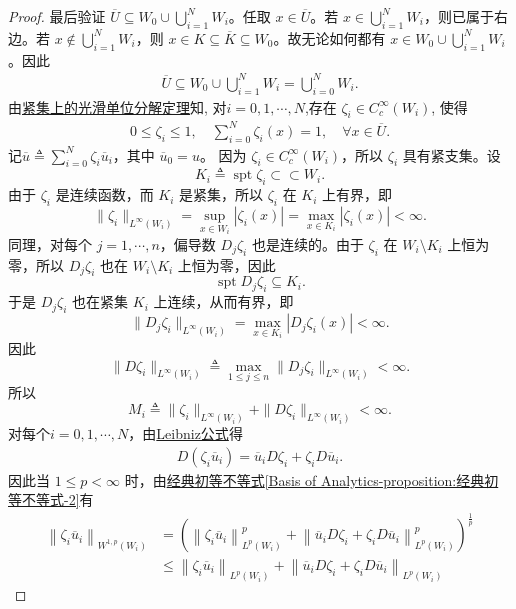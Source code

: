\documentclass[../../main.tex]{subfiles}
\begin{document}
\begin{proof}
最后验证 \(\overline{U}\subseteq W_0\cup\bigcup_{i=1}^N W_i\)。任取 \(x\in \overline{U}\)。若 \(x\in\bigcup_{i=1}^N W_i\)，则已属于右边。若 \(x\notin\bigcup_{i=1}^N W_i\)，则 \(x\in K\subseteq\overline{K}\subseteq W_0\)。故无论如何都有 \(x\in W_0\cup\bigcup_{i=1}^N W_i\)。因此
\begin{align*}
\overline{U}\subseteq W_0\cup\bigcup_{i=1}^N W_i=\bigcup_{i=0}^N W_i.
\end{align*}
由\hyperref[corollary:紧集上的光滑单位分解定理]{紧集上的光滑单位分解定理}知,
对$i=0,1,\cdots,N$,存在 $\zeta_i\in C_c^\infty(W_i)$, 使得
\begin{align*}
0\leqslant\zeta_i\leqslant1,\quad
\sum\limits_{i=0}^{N}\zeta_i(x)=1,\quad\forall x\in \overline{U}.
\end{align*}
记$\overline{u}\triangleq\sum_{i=0}^{N}\zeta_{i}\overline{u}_{i}$，其中 $\overline{u}_{0}=u$。
因为 \(\zeta_i\in C_c^\infty(W_i)\)，所以 \(\zeta_i\) 具有紧支集。设
\[
K_i\triangleq \operatorname{spt}\zeta_i\subset\subset W_i.
\]
由于 \(\zeta_i\) 是连续函数，而 \(K_i\) 是紧集，所以 \(\zeta_i\) 在 \(K_i\) 上有界，即
\[
\|\zeta_i\|_{L^\infty(W_i)}=\sup_{x\in W_i}|\zeta_i(x)|=\max_{x\in K_i}|\zeta_i(x)|<\infty.
\]
同理，对每个 \(j=1,\cdots,n\)，偏导数 \(D_j\zeta_i\) 也是连续的。由于 \(\zeta_i\) 在 \(W_i\setminus K_i\) 上恒为零，所以 \(D_j\zeta_i\) 也在 \(W_i\setminus K_i\) 上恒为零，因此
\[
\operatorname{spt}D_j\zeta_i\subseteq K_i.
\]
于是 \(D_j\zeta_i\) 也在紧集 \(K_i\) 上连续，从而有界，即
\[
\|D_j\zeta_i\|_{L^\infty(W_i)}=\max_{x\in K_i}|D_j\zeta_i(x)|<\infty.
\]
因此
\[
\|D\zeta_i\|_{L^\infty(W_i)}\triangleq \max_{1\leqslant j\leqslant n}\|D_j\zeta_i\|_{L^\infty(W_i)}<\infty.
\]
所以
\[
M_i\triangleq\|\zeta_i\|_{L^\infty(W_i)}+\|D\zeta_i\|_{L^\infty(W_i)}<\infty.
\]
对每个\(i=0,1,\cdots,N\)，由\hyperref[theorem:ch05-弱导数性质-4]{Leibniz公式}得
\begin{align*}
D(\zeta_i \overline{u}_i) = \overline{u}_i D\zeta_i + \zeta_i D\overline{u}_i.
\end{align*}
因此当 \(1\leqslant p<\infty\) 时，由\hyperref[Basis of Analytics-proposition:经典初等不等式]{经典初等不等式\ref{Basis of Analytics-proposition:经典初等不等式-2}}有
\begin{align*}
\left\| \zeta _i\overline{u}_i \right\| _{W^{1,p}\left( W_i \right)}&=\left( \left\| \zeta _i\overline{u}_i \right\| _{L^p\left( W_i \right)}^{p}+\left\| \overline{u}_iD\zeta _i+\zeta _iD\overline{u}_i \right\| _{L^p\left( W_i \right)}^{p} \right) ^{\frac{1}{p}}
\\
&\leqslant \left\| \zeta _i\overline{u}_i \right\| _{L^p\left( W_i \right)}+\left\| \overline{u}_iD\zeta _i+\zeta _iD\overline{u}_i \right\| _{L^p\left( W_i \right)}

\end{align*}
\end{proof}
\end{document}
